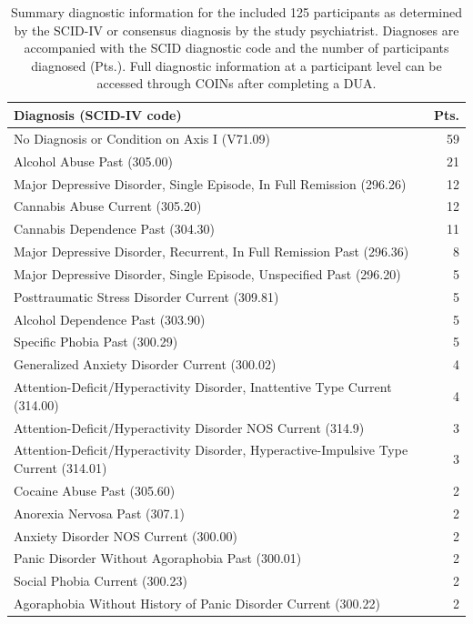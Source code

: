 \begin{table}[h!]
    \caption{Summary diagnostic information for the included 125 participants as determined by the SCID-IV or consensus diagnosis by the study psychiatrist. Diagnoses are accompanied with the SCID diagnostic code and the number of participants diagnosed (Pts.). Full diagnostic information at a participant level can be accessed through COINs after completing a DUA.}
    \centering
    \begin{tabular}{ lr }
        \textbf{Diagnosis (SCID-IV code)} & \textbf{Pts.} \\ \hline
        No Diagnosis or Condition on Axis I (V71.09) & 59 \\
        Alcohol Abuse Past (305.00) & 21 \\
        Major Depressive Disorder, Single Episode, In Full Remission (296.26) & 12 \\
        Cannabis Abuse Current (305.20) & 12 \\
        Cannabis Dependence Past (304.30) & 11 \\
        Major Depressive Disorder, Recurrent, In Full Remission Past (296.36) &  8 \\
        Major Depressive Disorder, Single Episode, Unspecified Past (296.20)  &  5 \\
        Posttraumatic Stress Disorder Current (309.81) & 5 \\
        Alcohol Dependence Past (303.90)  &  5 \\
        Specific Phobia Past (300.29)  & 5 \\
        Generalized Anxiety Disorder Current (300.02) &  4 \\
        Attention-Deficit/Hyperactivity Disorder, Inattentive Type Current (314.00) & 4 \\
        Attention-Deficit/Hyperactivity Disorder NOS Current (314.9)   & 3 \\
        Attention-Deficit/Hyperactivity Disorder, Hyperactive-Impulsive Type Current (314.01) &  3\\
        Cocaine Abuse Past (305.60) & 2 \\
        Anorexia Nervosa Past (307.1) &  2 \\
        Anxiety Disorder NOS Current (300.00) &   2 \\
        Panic Disorder Without Agoraphobia Past (300.01) &    2 \\
        Social Phobia Current (300.23) & 2 \\
        Agoraphobia Without History of Panic Disorder Current (300.22) &  2 \\

\end{tabular}
\end{table}
